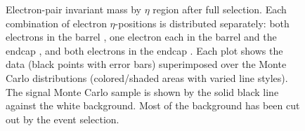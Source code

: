  \begin{figure}[htb]
  \begin{center}
  \end{center}
  \caption[\fixspacing Electron-pair invariant mass by $\eta$ region]{
    \fixspacing Electron-pair invariant mass by $\eta$ region after full selection.
    Each combination of electron $\eta$-positions is 
    distributed separately: 
    both electrons in the barrel 
    , 
    one electron each in the barrel and the endcap 
    ,
    and both electrons in the endcap 
    .
    Each plot shows the data (black points with error bars) superimposed over the Monte Carlo 
    distributions (colored/shaded areas with varied line styles).  
    The signal Monte Carlo sample is shown by the solid black line against the white background.  
    Most of the background has been cut out by the event selection.  
  }
  \label{fig:InvMassEtaDiv}
 \end{figure}

